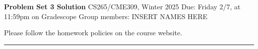 \newcommand{\N}{\mathbb{N}}
\newcommand{\Ex}[1]{\operatorname*{\mathbb{E}}\left[#1\right]}
\newcommand{\R}{\ensuremath{\mathbb{R}}}
\newcommand{\Var}{\operatorname*{Var}}
\newcommand{\E}{\ensuremath{\mathcal{E}}}
\newcommand{\Z}{\mathbb{Z}}
\newcommand{\rank}{\ensuremath{\mathrm{rank}}}


\noindent
\textbf{Problem Set 3 \ifdefined\sol Solution \fi} \hfill CS265/CME309, Winter 2025
\ifdefined\sol\else
\newline
Due: Friday 2/7, at 11:59pm on Gradescope
\ifdefined\template
\newline 
Group members: INSERT NAMES HERE
\fi

\vspace{.4cm}\noindent
Please follow the homework policies on the course website.
\fi

\noindent
\rule{\linewidth}{0.4pt}

